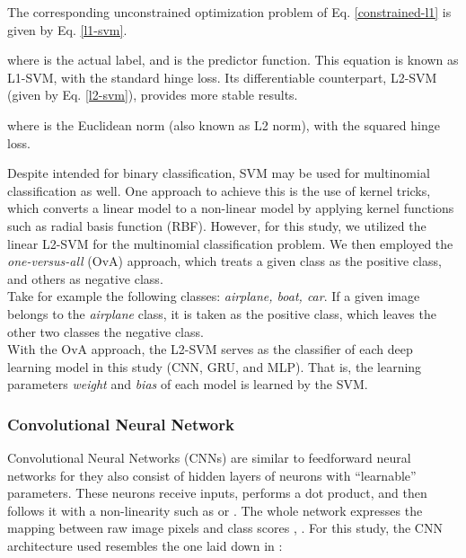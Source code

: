\documentclass[sigconf]{acmart}
\begin{document}
The corresponding unconstrained optimization problem of Eq. \ref{constrained-l1} is given by Eq. \ref{l1-svm}.


\indent where  is the actual label, and  is the predictor function. This equation is known as L1-SVM, with the standard hinge loss. Its differentiable counterpart, L2-SVM (given by Eq. \ref{l2-svm}), provides more stable results\cite{tang2013deep}.



where  is the Euclidean norm (also known as L2 norm), with the squared hinge loss.

Despite intended for binary classification, SVM may be used for multinomial classification as well. One approach to achieve this is the use of kernel tricks, which converts a linear model to a non-linear model by applying kernel functions such as radial basis function (RBF). However, for this study, we utilized the linear L2-SVM for the multinomial classification problem. We then employed the \textit{one-versus-all} (OvA) approach, which treats a given class  as the positive class, and others as negative class.\\
\indent	Take for example the following classes: \textit{airplane, boat, car}. If a given image belongs to the \textit{airplane} class, it is taken as the positive class, which leaves the other two classes the negative class.\\
\indent	With the OvA approach, the L2-SVM serves as the classifier of each deep learning model in this study (CNN, GRU, and MLP). That is, the learning parameters \textit{weight} and \textit{bias} of each model is learned by the SVM.

\subsubsection{Convolutional Neural Network}\label{cnn}
Convolutional Neural Networks (CNNs) are similar to feedforward neural networks for they also consist of hidden layers of neurons with ``learnable'' parameters. These neurons receive inputs, performs a dot product, and then follows it with a non-linearity such as  or . The whole network expresses the mapping between raw image pixels  and class scores , . For this study, the CNN architecture used resembles the one laid down in \cite{tensorflow_2017}:
\end{document}
